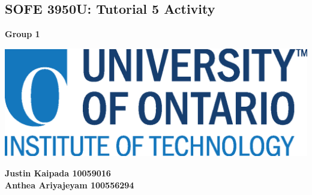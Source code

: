 \documentclass[12pt]{article}
\author{Justin Kaipada}
\date{\today}
\title{}
\begin{document}
\begin{center}
  \section*{\textbf{SOFE 3950U: Tutorial 5 Activity}}
  \label{sec:org9d54f69}
\end{center}

\begin{center}
  \textbf{Group 1}
\end{center}

\begin{center}
  \includegraphics[scale=1.5]{uoit_logo.png}
\end{center}

\vspace{50mm}

\begin{center}
  \textbf{Justin Kaipada 10059016}\\
  \textbf{Anthea Ariyajeyam 100556294}
\end{center}

\newpage
\end{document}
